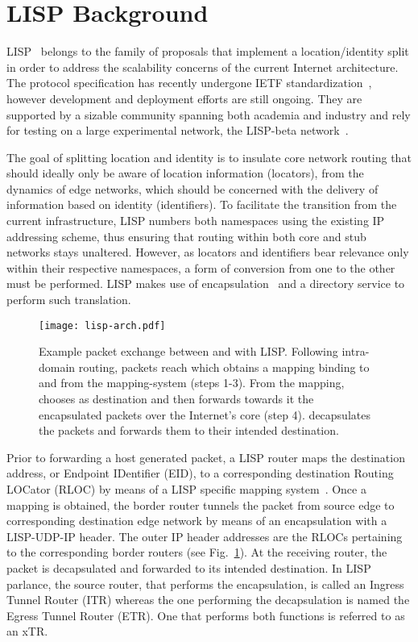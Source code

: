 \documentclass[twocolumn, 10pt]{article}
\theoremstyle{plain}
\begin{document}
\section{LISP Background}\label{sec:background}
LISP~\cite{saucez:lisp} belongs to the family of proposals that implement
a location/identity split in order to address the scalability concerns of the
current Internet architecture. The protocol specification has recently
undergone IETF standardization~\cite{rfc6830}, however development and
deployment efforts are still ongoing. They are supported by a sizable
community spanning both academia and industry and rely for testing on a large
experimental network, the LISP-beta network~\cite{lisp:testbed}. 

The goal of splitting location and identity is to insulate core network
routing that should ideally only be aware of location information (locators),
from the dynamics of edge networks, which should be concerned with the delivery of
information based on identity (identifiers). To facilitate the transition from the current
infrastructure, LISP numbers both namespaces using the existing IP addressing
scheme, thus ensuring that routing within both core and stub networks stays unaltered.
However, as locators and identifiers bear relevance only within their
respective namespaces, a form of conversion from one to the other must be
performed. LISP makes use of encapsulation~\cite{rfc1955} and a directory
service to perform such translation.

\begin{figure}[t]
    \centering
    \texttt{[image: lisp-arch.pdf]}
    \caption{Example packet exchange between  and  with
    LISP. Following intra-domain routing, packets reach  which
    obtains a mapping binding  to  and  from the mapping-system
    (steps 1-3). From the mapping,  chooses  as destination
    and then forwards towards it the encapsulated packets over the Internet's
    core (step 4).  decapsulates the packets and forwards them to their
    intended destination. }
    \label{fig:lisp-arch}
\end{figure}

Prior to forwarding a host generated packet, a LISP router maps the
destination address, or Endpoint IDentifier (EID), to a corresponding
destination Routing LOCator (RLOC) by means of a LISP specific mapping
system~\cite{draft:lisp-ddt,jakab:lisp-tree}.  Once a mapping
is obtained, the border router tunnels the packet from source edge to
corresponding destination edge network by means of an encapsulation with a
LISP-UDP-IP header. The outer IP header addresses are the RLOCs pertaining to
the corresponding border routers (see Fig.~\ref{fig:lisp-arch}). At the
receiving router, the packet is decapsulated and forwarded to its intended
destination. In LISP parlance, the source router, that performs the
encapsulation, is called an Ingress Tunnel Router (ITR) whereas the one
performing the decapsulation is named the Egress Tunnel Router (ETR). One that
performs both functions is referred to as an xTR. 
\end{document}
